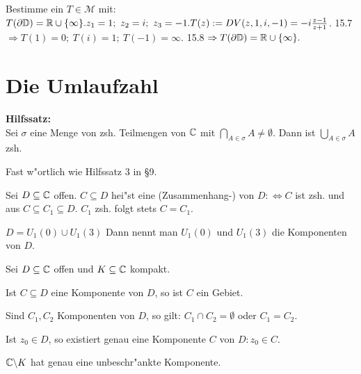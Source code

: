 \documentclass[a4paper,twoside,DIV15,BCOR12mm]{scrbook}
\begin{document}
\begin{beispiel}
Bestimme ein $T \in \mathcal{M}$ mit: $T(\partial \mathbb{D}) = \mathbb{R} \cup \{ \infty \}. z_1 = 1; \ z_2=i; \ z_3 = -1. T(z) := DV(z,1,i,-1) = -i\frac{z-1}{z+1}$. 15.7 $\Rightarrow T(1) = 0; \ T(i) = 1; \ T(-1) = \infty.$ 15.8 $\Rightarrow T(\partial \mathbb{D}) = \mathbb{R} \cup \{ \infty \}.$
\end{beispiel}


\chapter{Die Umlaufzahl}
{\bf Hilfssatz:}\\
Sei $\sigma$ eine Menge von zsh. Teilmengen von $\mathbb{C}$ mit $\bigcap_{A \in \sigma} A \not= \emptyset$. Dann ist $\bigcup_{A \in \sigma} A$ zsh.

\begin{beweis}
Fast w"ortlich wie Hilfssatz 3 in §9.
\end{beweis}

\begin{definition}
Sei $D \subseteq \mathbb{C}$ offen. $C \subseteq D$ hei"st eine (Zusammenhang-) von $D :\Leftrightarrow C$ ist zsh. und aus $C \subseteq C_1 \subseteq D$. $C_1$ zsh. folgt stets $C=C_1$.
\end{definition}

\begin{beispiel}
$D = U_1(0) \cup U_1(3)$ Dann nennt man $U_1(0)$ und $U_1(3)$ die Komponenten von $D$.
\end{beispiel}

\begin{satz}
Sei $D \subseteq \mathbb{C}$ offen und $K \subseteq \mathbb{C}$ kompakt.
\begin{liste}
\item Ist $C \subseteq D$ eine Komponente von $D$, so ist $C$ ein Gebiet.
\item Sind $C_1,C_2$ Komponenten von $D$, so gilt: $C_1 \cap C_2 = \emptyset$ oder $C_1 = C_2$.
\item Ist $z_0 \in D$, so  existiert genau eine Komponente $C$ von $D: z_0 \in C$.
\item $\mathbb{C} \backslash K$ hat genau eine unbeschr"ankte Komponente.
\end{liste}
\end{satz}
\end{document}
